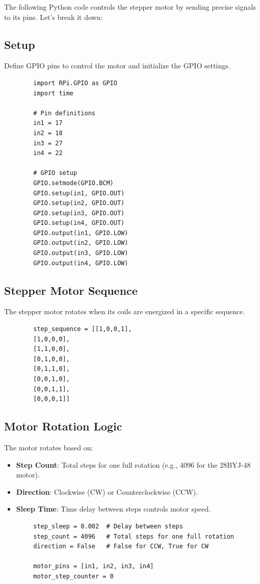 \documentclass{article}
\begin{document}
	The following Python code controls the stepper motor by sending precise signals to its pins. Let’s break it down:
	
	\subsection*{Setup}
	Define GPIO pins to control the motor and initialize the GPIO settings.
	
	\begin{lstlisting}
		import RPi.GPIO as GPIO
		import time
		
		# Pin definitions
		in1 = 17
		in2 = 18
		in3 = 27
		in4 = 22
		
		# GPIO setup
		GPIO.setmode(GPIO.BCM)
		GPIO.setup(in1, GPIO.OUT)
		GPIO.setup(in2, GPIO.OUT)
		GPIO.setup(in3, GPIO.OUT)
		GPIO.setup(in4, GPIO.OUT)
		GPIO.output(in1, GPIO.LOW)
		GPIO.output(in2, GPIO.LOW)
		GPIO.output(in3, GPIO.LOW)
		GPIO.output(in4, GPIO.LOW)
	\end{lstlisting}
	
	\subsection*{Stepper Motor Sequence}
	The stepper motor rotates when its coils are energized in a specific sequence.
	
	\begin{lstlisting}
		step_sequence = [[1,0,0,1],
		[1,0,0,0],
		[1,1,0,0],
		[0,1,0,0],
		[0,1,1,0],
		[0,0,1,0],
		[0,0,1,1],
		[0,0,0,1]]
	\end{lstlisting}
	
	\subsection*{Motor Rotation Logic}
	The motor rotates based on:
	\begin{itemize}
		\item \textbf{Step Count}: Total steps for one full rotation (e.g., 4096 for the 28BYJ-48 motor).
		\item \textbf{Direction}: Clockwise (CW) or Counterclockwise (CCW).
		\item \textbf{Sleep Time}: Time delay between steps controls motor speed.
	\end{itemize}
	
	\begin{lstlisting}
		step_sleep = 0.002  # Delay between steps
		step_count = 4096   # Total steps for one full rotation
		direction = False   # False for CCW, True for CW
		
		motor_pins = [in1, in2, in3, in4]
		motor_step_counter = 0
	\end{lstlisting}
	
\end{document}
